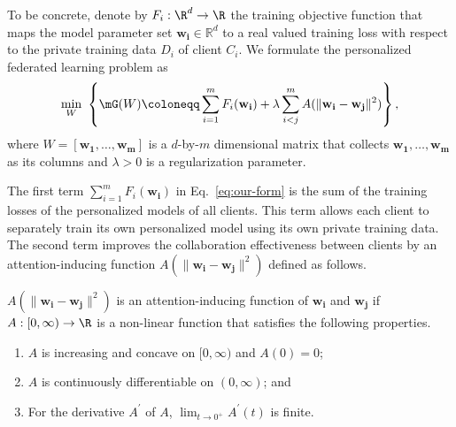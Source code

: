 

To be concrete, denote by $F_i:\R^d\rightarrow\R$ the training objective function that maps the model parameter set $\mathbf{w_i}\in\mathbb{R}^d$ to a real valued training loss with respect to the private training data $D_i$ of client $C_i$.
We formulate the personalized federated learning problem as 
\begin{equation}
\label{eq:our-form}
\min_{W} \ \left\{\mG(W)\coloneqq \sum_{i=1}^m F_i(\mathbf{w_i}) + \lambda\sum_{i<j}^m A(\|\mathbf{w_i} - \mathbf{w_j}\|^2)\right\}, 
\end{equation}
where $W = [\mathbf{w_1},\dots,\mathbf{w_m}]$ is a $d$-by-$m$ dimensional matrix that collects $\mathbf{w_1},\dots,\mathbf{w_m}$ as its columns and $\lambda>0$ is a regularization parameter.

The first term $\sum_{i=1}^m F_i(\mathbf{w_i})$ in Eq.~\eqref{eq:our-form} is the sum of the training losses of the personalized models of all clients. This term allows each client to separately train its own personalized model using its own private training data.
%
The second term improves the collaboration effectiveness between clients by an attention-inducing function $A(\|\mathbf{w_i} - \mathbf{w_j}\|^2)$ defined as follows.


\begin{defi}\label{defi:att-ind}
$A(\|\mathbf{w_i} - \mathbf{w_j}\|^2)$ is an attention-inducing function of $\mathbf{w_i}$ and $\mathbf{w_j}$ if $A:[0,\infty)\rightarrow\R$ is a non-linear function that satisfies the following properties. 
\begin{enumerate}
\item $A$ is increasing and concave on $[0,\infty)$ and $A(0) = 0$;
\item $A$ is continuously differentiable on $(0,\infty)$; and
\item For the derivative $A^\prime$ of $A$, $\lim_{t\rightarrow 0^+} A^\prime(t)$ is finite.
\end{enumerate}
\end{defi}

